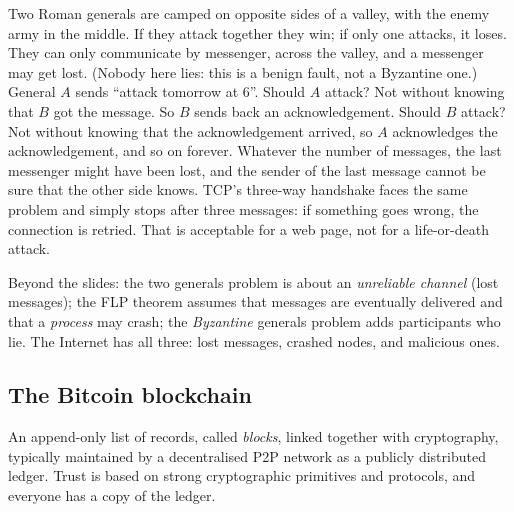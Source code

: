 \begin{example}
Two Roman generals are camped on opposite sides of a valley, with the enemy army in the middle. If they attack together they win; if only one attacks, it loses. They can only communicate by messenger, across the valley, and a messenger may get lost. (Nobody here lies: this is a benign fault, not a Byzantine one.) General $A$ sends \enquote{attack tomorrow at 6}. Should $A$ attack? Not without knowing that $B$ got the message. So $B$ sends back an acknowledgement. Should $B$ attack? Not without knowing that the acknowledgement arrived, so $A$ acknowledges the acknowledgement, and so on forever. Whatever the number of messages, the last messenger might have been lost, and the sender of the last message cannot be sure that the other side knows. TCP's three-way handshake faces the same problem and simply stops after three messages: if something goes wrong, the connection is retried. That is acceptable for a web page, not for a life-or-death attack.

Beyond the slides: the two generals problem is about an \emph{unreliable channel} (lost messages); the FLP theorem assumes that messages are eventually delivered and that a \emph{process} may crash; the \emph{Byzantine} generals problem adds participants who lie. The Internet has all three: lost messages, crashed nodes, and malicious ones.
\end{example}

\subsection{The Bitcoin blockchain}

\begin{definition}[Blockchain]
An append-only list of records, called \emph{blocks}, linked together with cryptography, typically maintained by a decentralised P2P network as a publicly distributed ledger. Trust is based on strong cryptographic primitives and protocols, and everyone has a copy of the ledger.
\end{definition}

